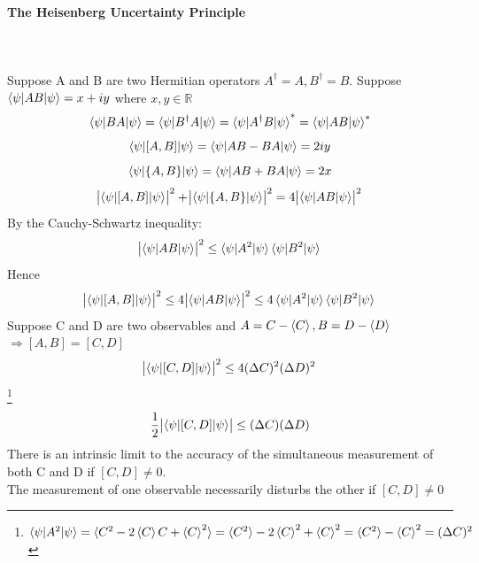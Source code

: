 \documentclass[]{book}
\theoremstyle{nonumberplain}
\begin{document}
\paragraph{The Heisenberg Uncertainty Principle}
\label{par:the_heisenberg_uncertainty_principle}
\ \\
\\
Suppose A and B are two Hermitian operators $A^{\dagger}=A, B^{\dagger}=B$. Suppose $\braket{\psi|AB|\psi}=x+iy$ where $x,y \in \mathbb{R}$ 
\[
\braket{\psi|BA|\psi}=\braket{\psi|B^{\dagger}A|\psi}=\braket{\psi|A^{\dagger}B|\psi}^{*}=\braket{\psi|AB|\psi}^{*}
\] 
\[
	\braket{\psi|[A,B]|\psi}=\braket{\psi|AB-BA|\psi}=2iy
\] 
\[
	\braket{\psi|\{A,B\}|\psi}=\braket{\psi|AB+BA|\psi}=2x
\] 
\[
	\abs{\braket{\psi|[A,B]|\psi}}^{2}+\abs{\braket{\psi|\{A,B\}|\psi}}^{2}=4\abs{\braket{\psi|AB|\psi}}^{2}
\] 
By the Cauchy-Schwartz inequality:
\[
\abs{\braket{\psi|AB|\psi}}^{2} \leq \braket{\psi|A^{2}|\psi}\braket{\psi|B^{2}|\psi}
\] 
Hence
\[
	\abs{\braket{\psi|[A,B]|\psi}}^{2}\leq 4\abs{\braket{\psi|AB|\psi}}^{2}\leq 4\braket{\psi|A^{2}|\psi}\braket{\psi|B^{2}|\psi}
\] 
Suppose C and D are two observables and $A=C-\braket{C}, B=D-\braket{D}$$\Rightarrow [A,B]=[C,D]$
\[
	\abs{\braket{\psi|[C,D]|\psi}}^{2} \leq 4(\Delta C)^{2}(\Delta D)^{2}
\] \footnote{$\braket{\psi|A^{2}|\psi}=\braket{C^{2}-2\braket{C}C+\braket{C}^{2}}=\braket{C^{2}}-2\braket{C}^{2}+\braket{C}^{2}=\braket{C^{2}}-\braket{C}^{2}=(\Delta C)^{2}$}
\[
	\frac{1}{2}\abs{\braket{\psi|[C,D]|\psi}}\leq (\Delta C)(\Delta D)
\] 
There is an intrinsic limit to the accuracy of the simultaneous measurement of both C and D if $[C,D]\neq 0.$ \\
The measurement of one observable necessarily disturbs the other if $[C,D]\neq 0$
\end{document}
